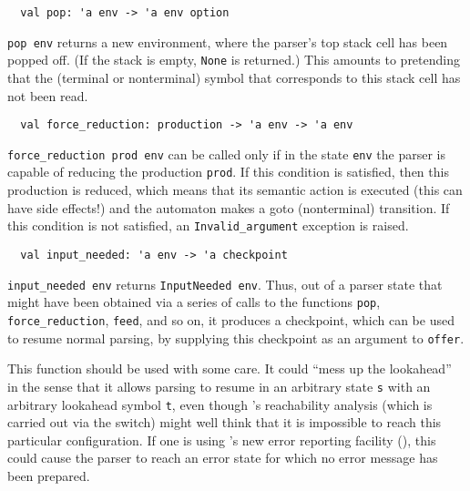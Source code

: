 \documentclass[onecolumn,11pt,nocopyrightspace,preprint]{sigplanconf}
\begin{document}

\begin{verbatim}
  val pop: 'a env -> 'a env option
\end{verbatim}

\verb+pop env+ returns a new environment, where the parser's top stack cell
has been popped off. (If the stack is empty, \verb+None+ is returned.) This
amounts to pretending that the (terminal or nonterminal) symbol that
corresponds to this stack cell has not been read.


\begin{verbatim}
  val force_reduction: production -> 'a env -> 'a env
\end{verbatim}

\verb+force_reduction prod env+ can be called only if in the state \verb+env+
the parser is capable of reducing the production \verb+prod+. If this
condition is satisfied, then this production is reduced, which means that its
semantic action is executed (this can have side effects!) and the automaton
makes a goto (nonterminal) transition. If this condition is not satisfied, an
\verb+Invalid_argument+ exception is raised.


\begin{verbatim}
  val input_needed: 'a env -> 'a checkpoint
\end{verbatim}

\verb+input_needed env+ returns \verb+InputNeeded env+. Thus, out of a parser
state that might have been obtained via a series of calls to the functions
\verb+pop+, \verb+force_reduction+, \verb+feed+, and so on, it produces a
checkpoint, which can be used to resume normal parsing, by supplying this
checkpoint as an argument to \verb+offer+.

This function should be used with some care. It could ``mess up the
lookahead'' in the sense that it allows parsing to resume in an arbitrary
state \verb+s+ with an arbitrary lookahead symbol \verb+t+, even though
\menhir's reachability analysis (which is carried out via the \olisterrors
switch) might well think that it is impossible to reach this particular
configuration. If one is using \menhir's new error reporting facility
(), this could cause the parser to reach an error state
for which no error message has been prepared.

\end{document}
